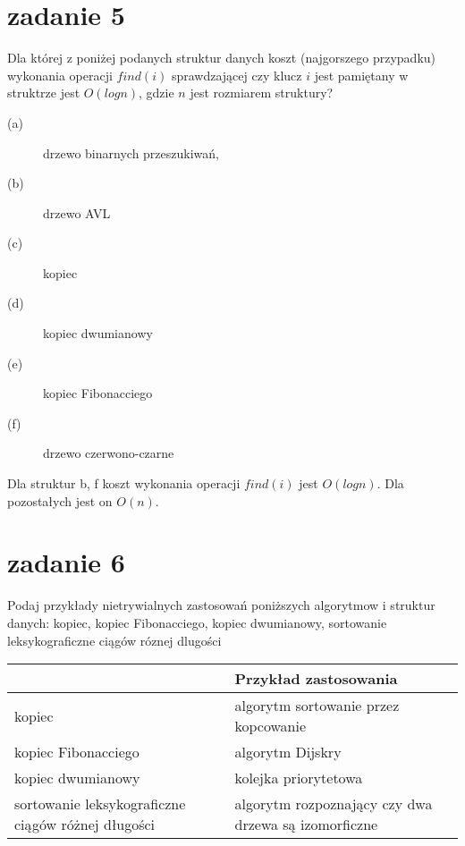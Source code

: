 \documentclass[svgnames]{report}
\begin{document}

\section{zadanie 5}
\begin{framed}
Dla której z poniżej podanych struktur danych koszt (najgorszego przypadku) wykonania operacji $find(i)$ sprawdzającej czy klucz $i$ jest pamiętany w struktrze jest $O(log n)$, gdzie $n$ jest rozmiarem struktury?
\begin{description}
	\item[(a)] drzewo binarnych przeszukiwań,
	\item[(b)] drzewo AVL
	\item[(c)] kopiec
	\item[(d)] kopiec dwumianowy
	\item[(e)] kopiec Fibonacciego
	\item[(f)] drzewo czerwono-czarne
\end{description}
\end{framed}
Dla struktur b, f koszt wykonania operacji $find(i)$ jest $O(log n)$.
Dla pozostałych jest on $O(n)$.


\section{zadanie 6}
\begin{framed}
Podaj przykłady nietrywialnych zastosowań poniższych algorytmow i struktur danych:
kopiec, kopiec Fibonacciego, kopiec dwumianowy, sortowanie leksykograficzne ciągów róznej dlugości
\end{framed}

\begin{tabular}{l|l}
					&	Przykład zastosowania	\\	\hline
kopiec 				&	algorytm sortowanie przez kopcowanie	\\	\hline
kopiec Fibonacciego &	algorytm Dijskry	\\	\hline
kopiec dwumianowy 	&	kolejka priorytetowa	\\	\hline
sortowanie leksykograficzne ciągów różnej długości & algorytm rozpoznający czy dwa drzewa są izomorficzne	\\	\hline
\end{tabular}
\end{document}
